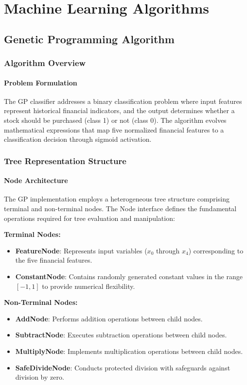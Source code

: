 \documentclass[a4paper,12pt]{article}
\begin{document}
\section{Machine Learning Algorithms}

\subsection{Genetic Programming Algorithm}
\subsubsection{Algorithm Overview}

\paragraph{Problem Formulation}
The GP classifier addresses a binary classification problem where input features represent historical financial indicators, and the output determines whether a stock should be purchased (class 1) or not (class 0). The algorithm evolves mathematical expressions that map five normalized financial features to a classification decision through sigmoid activation.

\subsubsection{Tree Representation Structure}
\paragraph{Node Architecture}
The GP implementation employs a heterogeneous tree structure comprising terminal and non-terminal nodes. The Node interface defines the fundamental operations required for tree evaluation and manipulation:

\textbf{Terminal Nodes:}
\begin{itemize}
    \item \textbf{FeatureNode}: Represents input variables ($x_0$ through $x_4$) corresponding to the five financial features.
    \item \textbf{ConstantNode}: Contains randomly generated constant values in the range $[-1, 1]$ to provide numerical flexibility.
\end{itemize}

\textbf{Non-Terminal Nodes:}
\begin{itemize}
    \item \textbf{AddNode}: Performs addition operations between child nodes.
    \item \textbf{SubtractNode}: Executes subtraction operations between child nodes.
    \item \textbf{MultiplyNode}: Implements multiplication operations between child nodes.
    \item \textbf{SafeDivideNode}: Conducts protected division with safeguards against division by zero.
\end{itemize}
\end{document}
